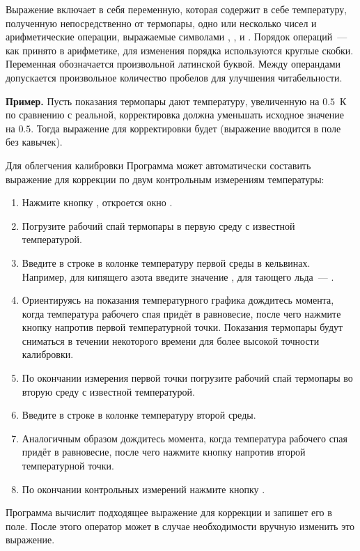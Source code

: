 Выражение включает в себя переменную, которая содержит в себе температуру, полученную непосредственно от термопары, одно или несколько чисел и арифметические операции, выражаемые символами \CMD{+}, \CMD{-}, \CMD{*} и \CMD{/}. Порядок операций~--- как принято в арифметике, для изменения порядка используются круглые скобки. Переменная обозначается произвольной латинской буквой. Между операндами допускается произвольное количество пробелов для улучшения читабельности.

{\bf Пример. } Пусть показания термопары дают температуру, увеличенную на $0.5$~К по сравнению с реальной, корректировка должна уменьшать исходное значение на $0.5$. Тогда выражение для корректировки будет \mbox{} (выражение вводится в поле без кавычек).

\bigskip

Для облегчения калибровки Программа может автоматически составить выражение для коррекции по двум контрольным измерениям температуры:

\begin{enumerate}
\item Нажмите кнопку , откроется окно .
\item Погрузите рабочий спай термопары в первую среду с известной температурой.
\item Введите в строке  в колонке  температуру первой среды в кельвинах. Например, для кипящего азота введите значение , для тающего льда~--- .
\item Ориентируясь на показания температурного графика дождитесь момента, когда температура рабочего спая придёт в равновесие, после чего нажмите кнопку  напротив первой температурной точки. Показания термопары будут сниматься в течении некоторого времени для более высокой точности калибровки.
\item По окончании измерения первой точки погрузите рабочий спай термопары во вторую среду с известной температурой.
\item Введите в строке  в колонке  температуру второй среды.
\item Аналогичным образом дождитесь момента, когда температура рабочего спая придёт в равновесие, после чего нажмите кнопку  напротив второй температурной точки.
\item По окончании контрольных измерений нажмите кнопку .
\end{enumerate}

Программа вычислит подходящее выражение для коррекции и запишет его в поле. После этого оператор может в случае необходимости вручную изменить это выражение.